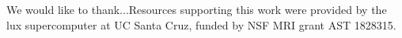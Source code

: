 
\acknowledgments
We would like to thank...Resources supporting this
work were provided by the lux supercomputer at UC Santa Cruz, funded by NSF MRI
grant AST 1828315.

